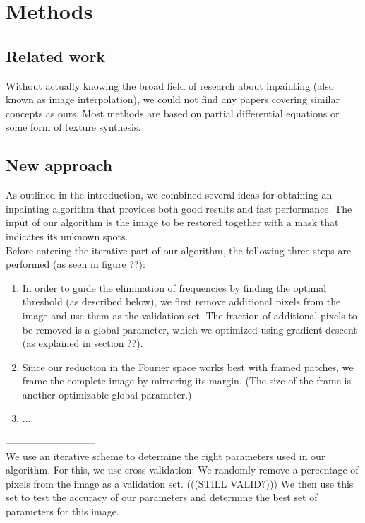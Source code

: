 \documentclass[10pt,conference,compsocconf]{IEEEtran}
\begin{document}
\section{Methods}
\subsection{Related work}
Without actually knowing the broad field of research about inpainting (also known as image interpolation), we could not find any papers covering similar concepts as ours. Most methods are based on partial differential equations or some form of texture synthesis.

\subsection{New approach}
As outlined in the introduction, we combined several ideas for obtaining an inpainting algorithm that provides both good results and fast performance. The input of our algorithm is the image to be restored together with a mask that indicates its unknown spots.\\
Before entering the iterative part of our algorithm, the following three steps are performed (as seen in figure ??):
\begin{enumerate}
\item In order to guide the elimination of frequencies by finding the optimal threshold (as described below), we first remove additional pixels from the image and use them as the validation set. The fraction of additional pixels to be removed is a global parameter, which we optimized using gradient descent (as explained in section ??).
\item Since our reduction in the Fourier space works best with framed patches, we frame the complete image by mirroring its margin. (The size of the frame is another optimizable global parameter.)
\item ...
\end{enumerate}


---------------------------\\


We use an iterative scheme to determine the right parameters used in our algorithm. For this, we use cross-validation: We randomly remove a percentage of pixels from the image as a validation set. (((STILL VALID?))) We then use this set to test the accuracy of our parameters and determine the best set of parameters for this image.
\end{document}
